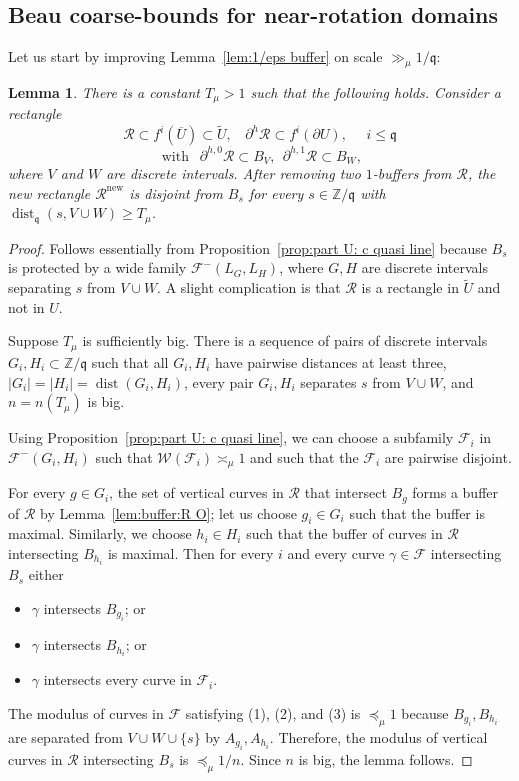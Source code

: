 \documentclass{amsart}
\renewcommand{\sp}{{\ \ }}
\newcommand{\1}{{\mathbb 1 }}
\newcommand{\Fam}{{\mathcal F}}
\newcommand{\Width}{{\mathcal W}}
\newcommand{\epscasc}{{\mu}}
\newcommand\RR{\mathcal{R}}
\newcommand{\qq}{\mathfrak{q}}
\newcommand\ovl{\overline}
\newcommand\new{{\operatorname{new}}}
\newcommand{\Z}{\mathbb{Z}}
\newtheorem{lem}[thm]{Lemma}
\theoremstyle{remark}
\numberwithin{equation}{section}
\theoremstyle{definition}
\newcommand{\dist}{\operatorname{dist}}
\begin{document}
\subsection{Beau coarse-bounds for near-rotation domains}
\label{ss:BeauCoarBnds} Let us start by improving Lemma~\ref{lem:1/eps buffer} on scale $\gg_\epscasc 1/\qq$:

\begin{lem}
\label{lem:1/eps buffer:impr} There is a constant $T_\epscasc >1$ such that the following holds. Consider a rectangle
\[\RR\subset f^i(\ovl U)\subset\widetilde U,\sp\sp \partial ^h \RR\subset f^i(\partial U), \sp\sp \sp i\le \qq\]
\[\text{ with } \sp\partial^{h,0} \RR\subset B_V,\sp \partial^{h,1} \RR\subset B_W, 
\]  where $V$ and $W$ are discrete intervals. After removing two $1$-buffers from $\RR$, the new rectangle $\RR^\new$ is disjoint from $B_s$ for every $s\in \Z/\qq$ with $\dist_\qq(s, V\cup W)\ge T_\epscasc$.
\end{lem}

\begin{proof}
Follows essentially from Proposition~\ref{prop:part U: c quasi line} because $B_s$ is protected  by a wide family $\Fam ^-(L_G,L_H)$, where $G,H$ are discrete intervals separating $s$ from $V\cup W$. A slight complication is that $\RR$ is a rectangle in $\widetilde U$ and not in $U$. 



Suppose $T_\epscasc$ is sufficiently big. There is a sequence of pairs of discrete intervals $G_i,H_i\subset \Z/\qq$ such that all $G_i,H_i$ have pairwise distances at least three, $|G_i|= |H_i|=\dist(G_i,H_i)$, every pair $G_i, H_i$ separates $s$ from $V\cup W$, and $n=n( T_\epscasc)$ is big. 

Using Proposition~\ref{prop:part U: c quasi line}, we can choose a subfamily $\Fam_i$ in $\Fam^-(G_i,H_i)$ such that  $\Width(\Fam_i)\asymp_\epscasc 1$ and such that the $\Fam_i$  are pairwise disjoint.

For every $g\in G_i$, the set of  vertical curves in $\RR$ that intersect $B_g$ forms a buffer of $\RR$ by Lemma~\ref{lem:buffer:R O}; let us choose $g_i\in G_i$ such that the buffer is maximal. Similarly, we choose $h_i\in H_i$ such that the buffer of curves in $\RR$ intersecting $B_{h_i}$ is maximal. Then for every $i$ and every curve $\gamma\in \Fam$ intersecting $B_s$ either
\begin{itemize}
\item[(1)] $\gamma$ intersects $B_{g_i}$; or
\item[(2)] $\gamma$ intersects $B_{h_i}$; or
\item[(3)] $\gamma $ intersects every curve in $\Fam_i$.
\end{itemize}
The modulus of curves in $\Fam$ satisfying (1), (2), and (3) is $\preceq _\epscasc 1$ because $B_{g_i} ,B_{h_i}$ are separated from $V\cup W\cup \{s\}$ by $A_{g_i} ,A_{h_i}$. Therefore, the modulus of  vertical curves in $\RR$ intersecting $B_s$ is $\preceq_\epscasc 1/n $. Since $n$ is big, the lemma follows.
\end{proof}
\end{document}
